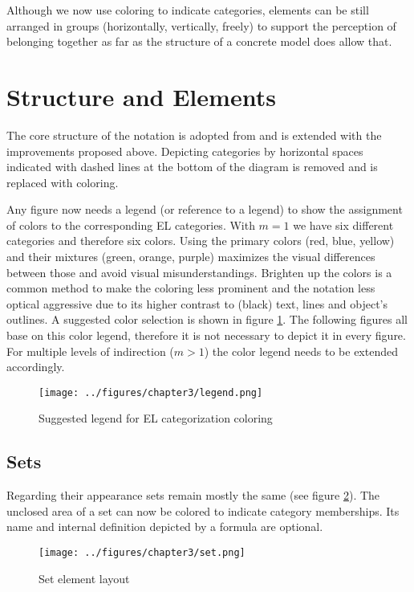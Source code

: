 \documentclass[twoside, openright, 12pt]{book}
\begin{document}
Although we now use coloring to indicate categories, elements can be still arranged in groups (horizontally, vertically, freely) to support the perception of belonging together as far as the structure of a concrete model does allow that.




\section{Structure and Elements}
\label{gsl_elements}
The core structure of the notation is adopted from \cite{Amthor18} and is extended with the improvements proposed above.
Depicting categories by horizontal spaces indicated with dashed lines at the bottom of the diagram is removed and is replaced with coloring.

Any figure now needs a legend (or reference to a legend) to show the assignment of colors to the corresponding EL categories.
With $m=1$ we have six different categories and therefore six colors.
Using the primary colors (red, blue, yellow) and their mixtures (green, orange, purple) maximizes the visual differences between those and avoid visual misunderstandings.
Brighten up the colors is a common method to make the coloring less prominent and the notation less optical aggressive due to its higher contrast to (black) text, lines and object's outlines.
A suggested color selection is shown in figure \ref{fig:legend}.
The following figures all base on this color legend, therefore it is not necessary to depict it in every figure.
For multiple levels of indirection ($m>1$) the color legend needs to be extended accordingly.

\begin{figure}[htb]
	\centering
	\texttt{[image: ../figures/chapter3/legend.png]}
	\caption{Suggested legend for EL categorization coloring}
	\label{fig:legend}
\end{figure}

\subsection{Sets}
Regarding their appearance sets remain mostly the same (see figure \ref{fig:set}).
The unclosed area of a set can now be colored to indicate category memberships.
Its name and internal definition depicted by a formula are optional.

\begin{figure}[htb]
	\centering
	\texttt{[image: ../figures/chapter3/set.png]}
	\caption{Set element layout}
	\label{fig:set}
\end{figure}
\end{document}
